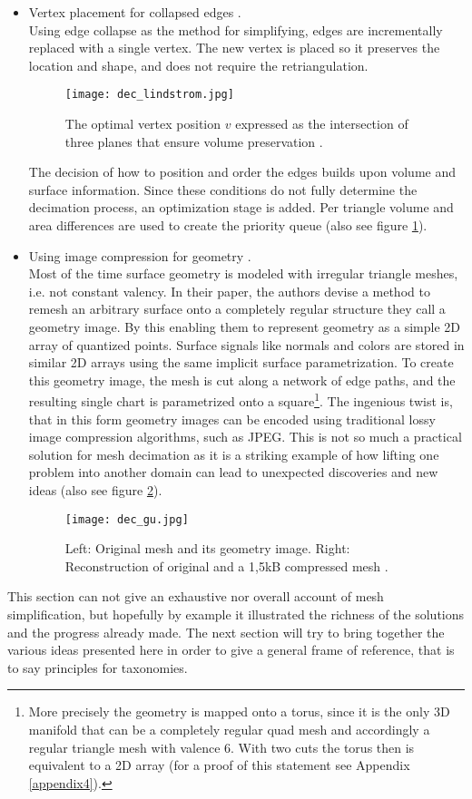 \begin{itemize}
    \item Vertex placement for collapsed edges \citep[cf.][]{Lindstrom1998}.\\
Using edge collapse as the method for simplifying, edges are incrementally replaced with a single vertex.
The new vertex is placed so it preserves the location and shape, and does not require the retriangulation.
\begin{figure}[ht]
\centering
\texttt{[image: dec\_lindstrom.jpg]}
\caption{The optimal vertex position $v$ expressed as the intersection of three planes that ensure volume preservation \citep[][p.284]{Lindstrom1998}.}
\label{fig:dec_lindstrom}
\end{figure}
The decision of how to position and order the edges builds upon volume and surface information.
Since these conditions do not fully determine the decimation process, an optimization stage is added.
Per triangle volume and area differences are used to create the priority queue (also see figure \ref{fig:dec_lindstrom}).

    \item Using image compression for geometry \citep[cf.][]{Gu2002}.\\
Most of the time surface geometry is modeled with irregular triangle meshes, i.e. not constant valency. In their paper, the authors devise a method to remesh an arbitrary surface onto a completely regular structure they call a geometry image. By this enabling them to represent geometry as a simple 2D array of quantized points. Surface signals like normals and colors are stored in similar 2D arrays using the same implicit surface parametrization. To create this geometry image, the mesh is cut along a network of edge paths, and the resulting single chart is parametrized onto a square\footnote{ More precisely the geometry is mapped onto a torus, since it is the only 3D manifold that can be a completely regular quad mesh and accordingly a regular triangle mesh with valence 6. With two cuts the torus then is equivalent to a 2D array (for a proof of this statement see Appendix \ref{appendix4}).}. The ingenious twist is, that in this form geometry images can be encoded using traditional lossy image compression algorithms, such as JPEG.
This is not so much a practical solution for mesh decimation as it is a striking example of how lifting one problem into another domain can lead to unexpected discoveries and new ideas (also see figure \ref{fig:dec_gu}).
\begin{figure}[ht]
\centering
\texttt{[image: dec\_gu.jpg]}
\caption{Left: Original mesh and its geometry image. Right: Reconstruction of original and a 1,5kB compressed mesh \citep[][p.356]{Gu2002}.}
\label{fig:dec_gu}
\end{figure}
\end{itemize}
This section can not give an exhaustive nor overall account of mesh simplification, but hopefully by example it illustrated the richness of the solutions and the progress already made.
The next section will try to bring together the various ideas presented here in order to give a general frame of reference, that is to say principles for taxonomies.

